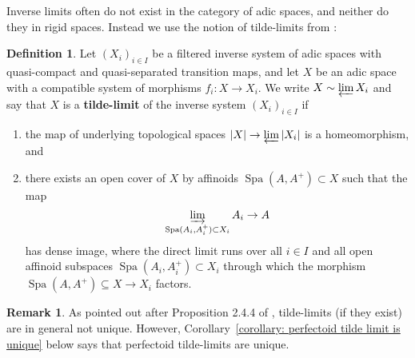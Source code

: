 \documentclass[10pt,oneside]{amsart}
\theoremstyle{definition}
\newtheorem{definition}[theorem]{Definition}
\newtheorem{remark}[theorem]{Remark}
\begin{document}
	Inverse limits often do not exist in the category of adic spaces, and neither do they in rigid spaces. Instead we use the notion of tilde-limits from \cite[Definition 2.4.2]{huber2013etale}:	
	\begin{definition} 
Let $(X_i)_{i\in I}$ be a filtered inverse system of adic spaces with quasi-compact and quasi-separated transition maps, and let $X$ be an adic space with a compatible system of morphisms $f_i\colon X \rightarrow X_i$. We write $X \sim \varprojlim X_i$ and say that $X$ is a \textbf{tilde-limit} of the inverse system $(X_i)_{i\in I}$ if 
\begin{enumerate}
	\item the map of underlying topological spaces $|X| \rightarrow \varprojlim |X_i|$ is a homeomorphism, and
	\item there exists an open cover of $X$ by affinoids $\operatorname{Spa} (A, A^+) \subset X$ such that the map 
$$ \varinjlim_{\operatorname{Spa}(A_i, A_i^+) \subset X_i} A_i \rightarrow A$$
has dense image, where the direct limit runs over all $i\in I$ and all open affinoid subspaces $\operatorname{Spa}(A_i, A_i^+) \subset X_i$ through which the morphism $\operatorname{Spa}(A, A^+) \subseteq X\rightarrow X_i$ factors.
\end{enumerate}
\end{definition}
\begin{comment}
\begin{definition}
Suppose, moreover, that there is an adic space $S$ with compatible maps $f_i:X_i\to S$, giving rise to a map $f:X\to S$, and a cover $\mathfrak U$ of open subspaces of $S$ such that for each $U\in \mathfrak U$, the $f_i^{-1}(U)$ and $f^{-1}(U)$ are all affine. Then if condition (2) above is satisfied with respect to the cover of $X$ by the $f^{-1}(U)$, we shall say that $X\sim_{\mathfrak U} \varprojlim X_i$  is a tilde-limit with respect to $\mathfrak U$. We say that it is a perfectoid tilde-limit with respect to $\mathfrak U$ if the $f^{-1}(U)$ are even affinoid perfectoid.
\end{definition}
\end{comment}
	\begin{remark} \label{remark:tilde_limit_non_unique}
As pointed out after Proposition 2.4.4 of \cite{SW}, tilde-limits (if they exist) are in general not unique. However, Corollary~\ref{corollary: perfectoid tilde limit is unique} below says that perfectoid tilde-limits are unique.
	\end{remark}
\end{document}
